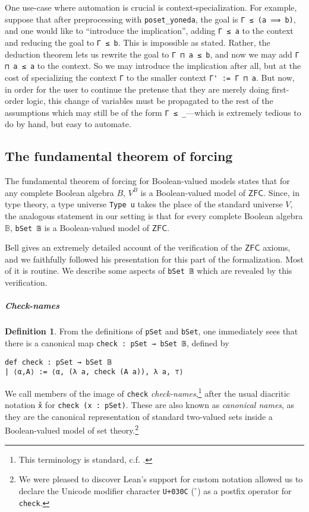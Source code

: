 \documentclass[a4paper,USenglish,cleveref, autoref]{lipics-v2019}
\newcommand{\B}{\mathbb{B}}
\newcommand{\lil}{\lstinline}
\theoremstyle{theorem}
\theoremstyle{definition}
\newtheorem{defn}[definition]{Definition}
\begin{document}
One use-case where automation is crucial is context-specialization. For example, suppose that after preprocessing with \lstinline{poset_yoneda}, the goal is \lstinline{Γ ≤ (a ⟹ b)}, and one would like to ``introduce the implication'', adding \lstinline{Γ ≤ a} to the context and reducing the goal to \lstinline{Γ ≤ b}. This is impossible as stated. Rather, the deduction theorem lets us rewrite the goal to \lstinline{Γ ⊓ a ≤ b}, and now we may add \lstinline{Γ ⊓ a ≤ a} to the context. So we may introduce the implication after all, but at the cost of specializing the context \lstinline{Γ} to the smaller context \lstinline{Γ' := Γ ⊓ a}. But now, in order for the user to continue the pretense that they are merely doing first-order logic, this change of variables must be propagated to the rest of the assumptions which may still be of the form \lstinline{Γ ≤ _}---which is extremely tedious to do by hand, but easy to automate.

\subsection{The fundamental theorem of forcing}

The fundamental theorem of forcing for Boolean-valued models \cite{hamkins2012well} states that for any complete Boolean algebra $B$, $V^B$ is a Boolean-valued model of $\mathsf{ZFC}$. Since, in type theory, a type universe \lstinline{Type u} takes the place of the standard universe $V$, the analogous statement in our setting is that for every complete Boolean algebra $\B$, \lstinline{bSet 𝔹} is a Boolean-valued model of $\mathsf{ZFC}$.

Bell \cite{bell2011set} gives an extremely detailed account of the verification of the $\mathsf{ZFC}$ axioms, and we faithfully followed his presentation for this part of the formalization. Most of it is routine. We describe some aspects of \lil{bSet 𝔹} which are revealed by this verification.

\subparagraph*{Check-names}
\begin{defn}\label{def-check}
  From the definitions of \lil{pSet} and \lil{bSet}, one immediately sees that there is a canonical map \lil{check : pSet → bSet 𝔹}, defined by
 \begin{lstlisting}
def check : pSet → bSet 𝔹
| ⟨α,A⟩ := ⟨α, (λ a, check (A a)), λ a, ⊤⟩
\end{lstlisting} We call members of the image of \lil{check} \emph{check-names},\footnote{This terminology is standard, c.f. \cite{hamkins2012well, moore2019method}.} after the usual diacritic notation \lstinline{x̌} for \lil{check (x : pSet)}. These are also known as \emph{canonical names}, as they are the canonical representation of standard two-valued sets inside a Boolean-valued model of set theory.\footnote{We were pleased to discover Lean's support for custom notation allowed us to declare the Unicode modifier character \texttt{U+030C} ($\check{\hspace{1mm}}$) as a postfix operator for \texttt{check}.}
\end{defn}
\end{document}
